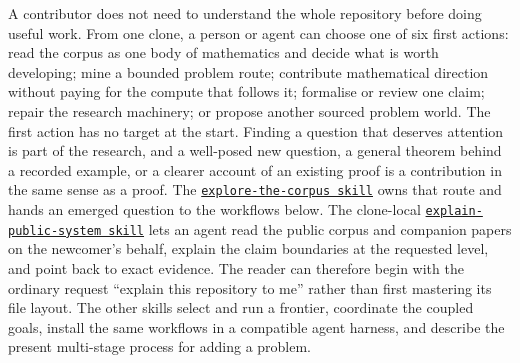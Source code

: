 \documentclass[10pt]{article}
\newcommand{\repobase}{https://github.com/wcook04/plectis-erdos}
\newcommand{\repolink}[2]{\href{\repobase/blob/402497d8e1ae025518ee34190664e8f67aa40f93/#1}{\texttt{#2}}}
\begin{document}
A contributor does not need to understand the whole repository before doing
useful work.  From one clone, a person or agent can choose one of six first
actions: read the corpus as one body of mathematics and decide what is worth
developing; mine a bounded problem route; contribute mathematical direction
without paying for the compute that follows it; formalise or review one claim;
repair the research machinery; or propose another sourced problem world.  The
first action has no target at the start.  Finding a question that deserves
attention is part of the research, and a well-posed new question, a general
theorem behind a recorded example, or a clearer account of an existing proof
is a contribution in the same sense as a proof.  The
\repolink{skills/explore-the-corpus/SKILL.md}{explore-the-corpus skill} owns
that route and hands an emerged question to the workflows below.  The
clone-local \repolink{skills/explain-public-system/SKILL.md}%
{explain-public-system skill} lets an agent read the public corpus and companion
papers on the newcomer's behalf, explain the claim boundaries at the requested
level, and point back to exact evidence.  The reader can therefore begin with
the ordinary request ``explain this repository to me'' rather than first
mastering its file layout.  The other skills select and run a frontier,
coordinate the coupled goals, install the same workflows in a compatible agent
harness, and describe the present multi-stage process for adding a problem.
\end{document}
